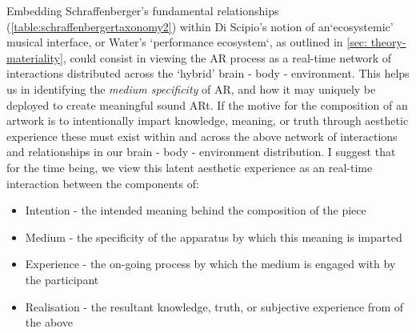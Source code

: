 Embedding Schraffenberger's fundamental relationships (\autoref{table:schraffenbergertaxonomy2}) within Di Scipio's notion of an`ecosystemic' musical interface, or Water's `performance ecosystem`, as outlined in \autoref{sec: theory-materiality}, could consist in viewing the AR process as a real-time network of interactions distributed across the `hybrid' brain - body - environment. This helps us in identifying the \textit{medium specificity} of AR, and how it may uniquely be deployed to create meaningful sound ARt. If the motive for the composition of an artwork is to intentionally impart knowledge, meaning, or truth through aesthetic experience these must exist within and across the above network of interactions and relationships in our brain - body - environment distribution. I suggest that for the time being, we view this latent aesthetic experience as an real-time interaction between the components of:
\begin{itemize}
    \item Intention - the intended meaning behind the composition of the piece
    \item Medium - the specificity of the apparatus by which this meaning is imparted
    \item Experience - the on-going process by which the medium is engaged with by the participant
    \item Realisation - the resultant knowledge, truth, or subjective experience from of the above
\end{itemize}

